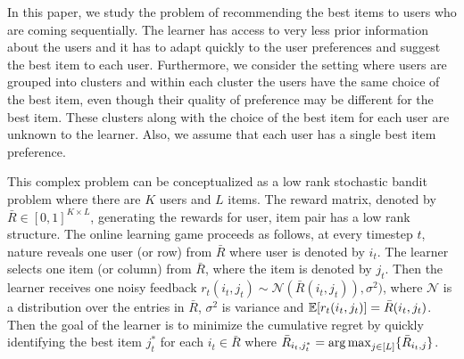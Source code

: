 In this paper, we study the problem of recommending the best items to users who are coming sequentially. The learner has access to very less prior information about the users and it has to adapt quickly to the user preferences and suggest the best item to each user. Furthermore, we consider the setting where users are grouped into clusters and within each cluster the users have the same choice of the best item, even though their quality of preference may be different for the best item. These clusters along with the choice of the best item for each user are unknown to the learner.  Also, we assume that each user has a single best item preference.

	This complex problem can be conceptualized as a low rank stochastic bandit problem where there are $K$ users and $L$ items. The reward matrix, denoted by $\bar{R}\in [0,1]^{K\times L}$,  generating the rewards for user, item pair has a low rank structure. The online learning game proceeds as follows, at every timestep $t$,  nature reveals one user (or row) from $\bar{R}$ where user is denoted by $i_t$. The learner selects one item (or column) from $\bar{R}$, where the item is denoted by $j_t$. Then the learner receives one noisy feedback $r_{t}(i_t,j_t)\sim\mathcal{N}(\bar{R}(i_t,j_t)),\sigma^2)$, where $\mathcal{N}$ is a distribution over the entries in $\bar{R}$, $\sigma^2$ is variance and $\mathbb{E}[r_{t}(i_t,j_t)] = \bar{R}(i_t,j_t)$. Then the goal of the learner is to minimize the cumulative regret by quickly identifying the best item $j^*_t$ for each $i_t\in \bar{R}$ where $\bar{R}_{i_t,j^*_t} = \mathop{\rm arg\,max} _{j\in[L]}\lbrace \bar{R}_{i_t,j} \rbrace$. %